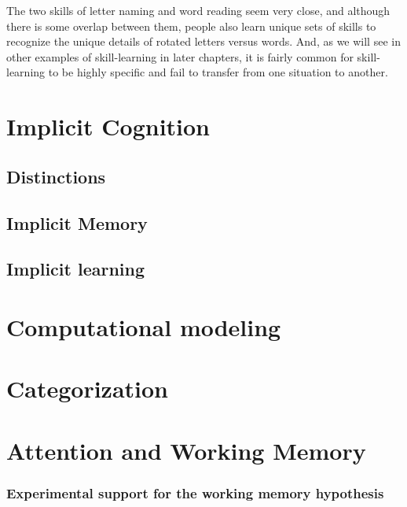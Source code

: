 \documentclass[
  oneside,
  12pt]{crumpbook}
\begin{document}
The two skills of letter naming and word reading seem very close, and although there is some overlap between them, people also learn unique sets of skills to recognize the unique details of rotated letters versus words. And, as we will see in other examples of skill-learning in later chapters, it is fairly common for skill-learning to be highly specific and fail to transfer from one situation to another.

\hypertarget{implicit-cognition}{%
\chapter{Implicit Cognition}\label{implicit-cognition}}

\hypertarget{distinctions}{%
\section{Distinctions}\label{distinctions}}

\hypertarget{implicit-memory}{%
\section{Implicit Memory}\label{implicit-memory}}

\hypertarget{implicit-learning}{%
\section{Implicit learning}\label{implicit-learning}}

\hypertarget{computational-modeling}{%
\chapter{Computational modeling}\label{computational-modeling}}

\hypertarget{categorization}{%
\chapter{Categorization}\label{categorization}}

\hypertarget{attention-and-working-memory}{%
\chapter{Attention and Working Memory}\label{attention-and-working-memory}}

\hypertarget{experimental-support-for-the-working-memory-hypothesis}{%
\subsection{Experimental support for the working memory hypothesis}\label{experimental-support-for-the-working-memory-hypothesis}}
\end{document}
